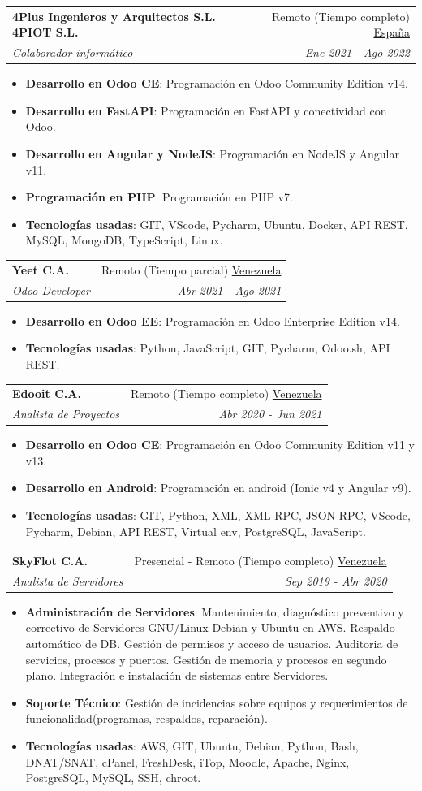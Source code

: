 \documentclass[a4paper,20pt]{article}
\makeatletter
\newcommand{\resumeItem}[2]{
  \item\small{
    \textbf{#1}{: #2 \vspace{-2pt}}
  }
}
\newcommand{\resumeSubheading}[4]{
  \vspace{-1pt}\item
    \begin{tabular*}{0.97\textwidth}{l@{\extracolsep{\fill}}r}
      \textbf{#1} & #2 \\
      \textit{#3} & \textit{#4} \\
    \end{tabular*}\vspace{-5pt}
}
\newcommand{\resumeItemListStart}{\begin{itemize}}
\newcommand{\resumeItemListEnd}{\end{itemize}\vspace{-5pt}}
\makeatother
\begin{document}
      
          \resumeSubheading{4Plus Ingenieros y Arquitectos S.L. | 4PIOT S.L.}{Remoto (Tiempo completo) \underline{España}}
    {Colaborador informático}{Ene 2021 - Ago 2022}
    \resumeItemListStart
    
     	\resumeItem{Desarrollo en Odoo CE}
          {Programación en Odoo Community Edition v14.}
        \resumeItem{Desarrollo en FastAPI}
          {Programación en FastAPI y conectividad con Odoo.}
        \resumeItem{Desarrollo en Angular y NodeJS}
          {Programación en NodeJS y Angular v11.}
         \resumeItem{Programación en PHP}
          {Programación en PHP v7.}
          \resumeItem{Tecnologías usadas}{GIT, VScode, Pycharm, Ubuntu, Docker, API REST, MySQL, MongoDB, TypeScript, Linux.}
      \resumeItemListEnd
\vspace{10pt}   
  
    \resumeSubheading{Yeet C.A.}{Remoto (Tiempo parcial) \underline{Venezuela}}
    {Odoo Developer}{Abr 2021 - Ago 2021}
    \resumeItemListStart
        \resumeItem{Desarrollo en Odoo EE}
          {Programación en Odoo Enterprise Edition v14.}
        \resumeItem{Tecnologías usadas}{Python, JavaScript, GIT, Pycharm, Odoo.sh, API REST.}
      \resumeItemListEnd
      \vspace{10pt}   
        
    \resumeSubheading{Edooit C.A.}{Remoto (Tiempo completo) \underline{Venezuela}}
    {Analista de Proyectos}{Abr 2020 - Jun 2021}
    \resumeItemListStart
        \resumeItem{Desarrollo en Odoo CE}
          {Programación en Odoo Community Edition v11 y v13.}
          \resumeItem{Desarrollo en Android}
          {Programación en android (Ionic v4 y Angular v9).}
          \resumeItem{Tecnologías usadas}{GIT, Python, XML, XML-RPC, JSON-RPC, VScode, Pycharm, Debian, API REST, Virtual env, PostgreSQL, JavaScript.}
      \resumeItemListEnd
\vspace{10pt}
    \resumeSubheading
		{SkyFlot C.A.}{Presencial - Remoto (Tiempo completo) \underline{Venezuela}}
		{Analista de Servidores}{Sep 2019 -  Abr 2020}
		\resumeItemListStart
        \resumeItem{Administración de Servidores}
          {Mantenimiento, diagnóstico preventivo y correctivo de Servidores GNU/Linux Debian y Ubuntu en AWS. Respaldo automático de DB. Gestión de permisos y acceso de usuarios. Auditoria de servicios, procesos y puertos. Gestión de memoria y procesos en segundo plano. Integración e instalación de sistemas entre Servidores.}
        \resumeItem{Soporte Técnico}
           {Gestión de incidencias sobre equipos y requerimientos de funcionalidad(programas, respaldos, reparación).}
        \resumeItem{Tecnologías usadas}{AWS, GIT, Ubuntu, Debian, Python, Bash, DNAT/SNAT, cPanel, FreshDesk, iTop, Moodle, Apache, Nginx, PostgreSQL, MySQL, SSH, chroot.}
		\resumeItemListEnd
		
\end{document}
